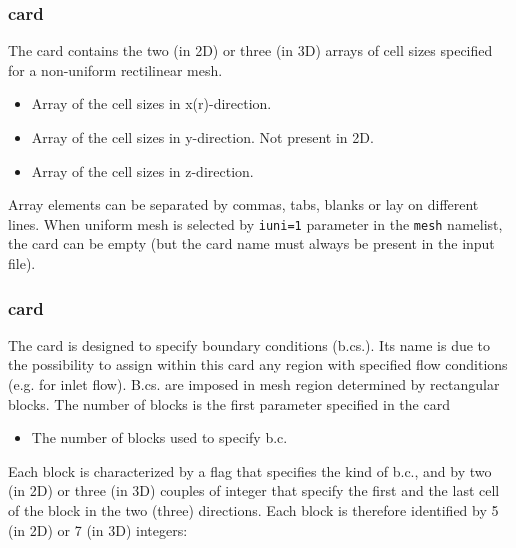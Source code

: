 \subsubsection{ card}

The  card contains the two (in 2D) or three (in 3D) arrays of cell 
sizes specified for a non-uniform rectilinear mesh. 

\begin{itemize}
\item
{}
{Array of the cell sizes in x(r)-direction.}

\item
{}
{Array of the cell sizes in y-direction.
Not present in 2D.}

\item
{}
{Array of the cell sizes in z-direction.}
\end{itemize}

Array elements can be separated by commas, tabs, blanks or lay on different
lines.  When uniform mesh is selected by {\tt iuni=1} parameter in the 
{\tt mesh} namelist, the card can be empty (but the card 
name must always be present in the input file).

\subsubsection{ card}

The  card is designed to specify boundary conditions (b.cs.).
Its name is due to the possibility to assign within this card any region with
specified flow conditions (e.g. for inlet flow). B.cs. are imposed in 
mesh region determined by rectangular blocks. The number of blocks is the
first parameter specified in the card

\begin{itemize}
\item
{}
{The number of blocks used to specify b.c.}
\end{itemize}

Each block is characterized
by a flag that specifies the kind of b.c., and by two (in 2D) or three (in 3D)
couples of integer that specify the first and the last cell of the block in 
the two (three) directions. Each block is therefore identified by 5 (in 2D)
or 7 (in 3D) integers:\\

